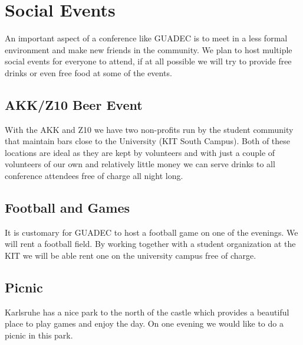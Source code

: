 \newpage

\section{Social Events}

An important aspect of a conference like GUADEC is to meet in a less formal
environment and make new friends in the community. We plan to host multiple
social events for everyone to attend, if at all possible we will try to
provide free drinks or even free food at some of the events.

\begin{multicols}{2}
\raggedcolumns

\subsection{AKK/Z10 Beer Event}

With the AKK and Z10 we have two non-profits run by the student community that
maintain bars close to the University (KIT South Campus).
Both of these locations are ideal as they are kept by volunteers and with just
a couple of volunteers of our own and relatively little money we can
serve drinks to all conference attendees free of charge all night long.

\subsection{Football and Games}

It is customary for GUADEC to host a football game on one of the evenings. We will
rent a football field. By working together with a student organization at the
KIT we will be able rent one on the university campus free of charge.

\subsection{Picnic}

Karlsruhe has a nice park to the north of the castle which provides a beautiful
place to play games and enjoy the day. On one evening we would like to do
a picnic in this park.

\columnbreak


\end{multicols}
